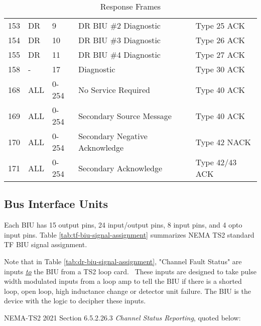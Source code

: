 \documentclass[]{article}
\begin{document}
\begin{table}[ht]
\begin{tabular}{@{}lllll@{}}
		153           & DR              & 9                & DR BIU \#2 Diagnostic          & Type 25 ACK       \\
		154           & DR              & 10               & DR BIU \#3 Diagnostic          & Type 26 ACK       \\
		155           & DR              & 11               & DR BIU \#4 Diagnostic          & Type 27 ACK       \\
		158           & -               & 17               & Diagnostic                     & Type 30 ACK       \\
		168           & ALL             & 0-254            & No Service Required            & Type 40 ACK       \\
		169           & ALL             & 0-254            & Secondary Source Message       & Type 40 ACK       \\
		170           & ALL             & 0-254            & Secondary Negative Acknowledge & Type 42 NACK      \\
		171           & ALL             & 0-254            & Secondary Acknowledge          & Type 42/43 ACK    \\ \bottomrule
	\end{tabular}
	\caption{Response Frames}
	\label{tab:response-frames}
\end{table}

\clearpage

\subsection {Bus Interface Units}
Each BIU has 15 output pins,  24 input/output pins,  8 input pins, and 4 opto input pins. Table \ref{tab:tf-biu-signal-assignment} summarizes NEMA TS2 standard TF BIU signal assignment.

Note that in Table \ref{tab:dr-biu-signal-assignment}, "Channel Fault Status" are inputs \textit{\underline{to}} the BIU from a TS2 loop card.  These inputs are designed to take pulse width modulated inputs from a loop amp to tell the BIU if there is a shorted loop, open loop, high inductance change or detector unit failure. The BIU is the device with the logic to decipher these inputs.   

NEMA-TS2 2021 Section 6.5.2.26.3 \textit{Channel Status Reporting}, quoted below:
\end{document}
